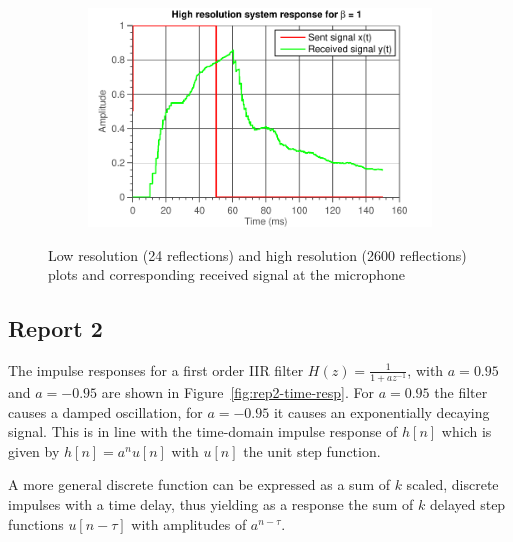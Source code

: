 \documentclass[11pt,titlepage]{report}
\begin{document}
\begin{figure}[H]
\begin{subfigure}{0.49\textwidth}
	\end{subfigure}
	\begin{subfigure}{0.49\textwidth}
		\includegraphics[width=\textwidth]{../../deliverable-7-resources/figures/ass-1/report-1/ass-1-report-1-system-response-25-copies-beta-1.pdf}
	\end{subfigure}
	\caption{Low resolution (24 reflections) and high resolution (2600 reflections) plots and corresponding received signal at the microphone}
	\label{fig:rep1-reflections-matlab}
\end{figure}

\subsection{Report 2}
The impulse responses for a first order IIR filter $H(z) = \frac{1}{1+az^{-1}}$, with $a=0.95$ and $a=-0.95$ are shown in Figure~\ref{fig:rep2-time-resp}. For $a=0.95$ the filter causes a damped oscillation, for $a=-0.95$ it causes an exponentially decaying signal. This is in line with the time-domain impulse response of $h[n]$ which is given by $h[n]=a^nu[n]$ with $u[n]$ the unit step function.

A more general discrete function can be expressed as a sum of $k$ scaled, discrete impulses with a time delay, thus yielding as a response the sum of $k$ delayed step functions $u[n-\tau]$ with amplitudes of $a^{n-\tau}$.
\end{document}
